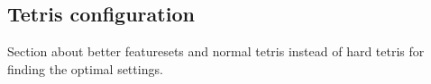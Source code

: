 \subsection{Tetris configuration}

Section about better featuresets and normal tetris instead of hard tetris
for finding the optimal settings.